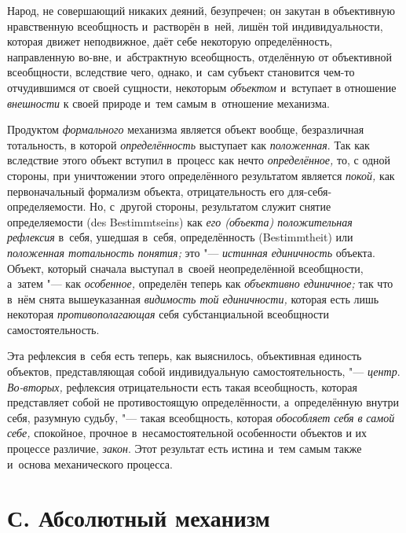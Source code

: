 Народ, не совершающий никаких деяний, безупречен; он закутан
в объективную нравственную всеобщность и~растворён в~ней, лишён той
индивидуальности, которая движет неподвижное, даёт себе некоторую
определённость, направленную во-вне, и~абстрактную всеобщность, отделённую
от объективной всеобщности, вследствие чего, однако, и~сам субъект
становится чем-то отчудившимся от своей сущности, некоторым
{\em объектом} и~вступает
в отношение {\em внешности}
к своей природе и~тем самым в~отношение механизма.


Продуктом
{\em формального}
механизма является объект вообще, безразличная тотальность, в
которой {\em определённость}
выступает как
{\em положенная}. Так как
вследствие этого объект вступил в~процесс как нечто
{\em определённое,} то, с
одной стороны, при уничтожении этого определённого результатом является
{\em покой,} как
первоначальный формализм объекта, отрицательность его
для-себя-определяемости. Но, с~другой стороны,
результатом служит
снятие
определяемости (des Bestimmt\-seins) как
{\em его (объекта) положительная
рефлексия} в~себя, ушедшая в~себя, определённость
(Bestimmt\-heit) или {\em положенная
тотальность понятия;} это
"--- {\em истинная единичность
}объекта. Объект, который сначала выступал в~своей
неопределённой всеобщности, а~затем "--- как
{\em особенное,}
определён теперь как
{\em объективно единичное;}
так что в~нём снята вышеуказанная
{\em видимость той единичности,}
которая есть лишь некоторая
{\em противополагающая}
себя субстанциальной всеобщности самостоятельность.

Эта рефлексия в~себя есть теперь, как выяснилось, объективная
единость объектов, представляющая собой индивидуальную самостоятельность,
"--- {\em центр}.
{\em Во-вторых,}
рефлексия отрицательности есть такая всеобщность, которая
представляет собой не противостоящую определённости, а~определённую внутри
себя, разумную судьбу, "--- такая всеобщность, которая
{\em обособляет себя в
}{\em самой себе,}
спокойное, прочное в~несамостоятельной особенности объектов и
их процессе различие, {\em закон}.
Этот результат есть истина и~тем самым также и~основа
механического процесса.

\section[С. Абсолютный механизм]{С. Абсолютный механизм}

